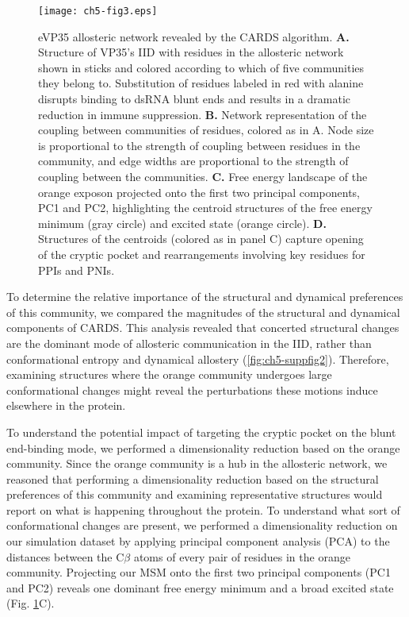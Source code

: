 \documentclass[../main.tex]{subfiles}
\begin{document}
        \begin{figure}[!htb] %
            \centering
            \texttt{[image: ch5-fig3.eps]}
            \caption[eVP35 allosteric network revealed by the CARDS algorithm]
                {eVP35 allosteric network revealed by the CARDS algorithm. \textbf{A.} Structure of VP35’s IID with residues in the allosteric network shown in sticks and colored according to which of five communities they belong to. Substitution of residues labeled in red with alanine disrupts binding to dsRNA blunt ends and results in a dramatic reduction in immune suppression. \textbf{B.} Network representation of the coupling between communities of residues, colored as in A. Node size is proportional to the strength of coupling between residues in the community, and edge widths are proportional to the strength of coupling between the communities. \textbf{C.} Free energy landscape of the orange exposon projected onto the first two principal components, PC1 and PC2, highlighting the centroid structures of the free energy minimum (gray circle) and excited state (orange circle). \textbf{D.} Structures of the centroids (colored as in panel C) capture opening of the cryptic pocket and rearrangements involving key residues for PPIs and PNIs.}
            \label{fig:ch5-fig3}
        \end{figure}


        To determine the relative importance of the structural and dynamical preferences of this community, we compared the magnitudes of the structural and dynamical components of CARDS. This analysis revealed that concerted structural changes are the dominant mode of allosteric communication in the IID, rather than conformational entropy and dynamical allostery (\ref{fig:ch5-suppfig2}). Therefore, examining structures where the orange community undergoes large conformational changes might reveal the perturbations these motions induce elsewhere in the protein.

        To understand the potential impact of targeting the cryptic pocket on the blunt end-binding mode, we performed a dimensionality reduction based on the orange community. Since the orange community is a hub in the allosteric network, we reasoned that performing a dimensionality reduction based on the structural preferences of this community and examining representative structures would report on what is happening throughout the protein. To understand what sort of conformational changes are present, we performed a dimensionality reduction on our simulation dataset by applying principal component analysis (PCA) to the distances between the C$\beta$ atoms of every pair of residues in the orange community. Projecting our MSM onto the first two principal components (PC1 and PC2) reveals one dominant free energy minimum and a broad excited state (Fig. \ref{fig:ch5-fig3}C).
\end{document}
